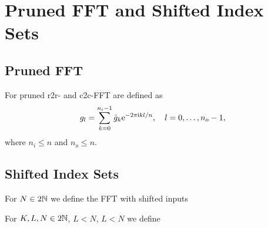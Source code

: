 \section{Pruned FFT and Shifted Index Sets}
\subsection{Pruned FFT}
For pruned r2r- and c2c-FFT are defined as
\begin{equation*}
  g_l = \sum_{k=0}^{n_i-1} \hat g_k \mathrm{e}^{-2\pi{\ensuremath{\text{\scriptsize{i}}}} kl/n}, \quad l=0,\hdots,n_o-1,
\end{equation*}
where $n_i\le n$ and $n_o\le n$.

\subsection{Shifted Index Sets}
For $N\in 2\mathbb{N}$ we define the FFT with shifted inputs


For $K,L,N\in 2\mathbb{N}$, $L<N$, $L<N$ we define



